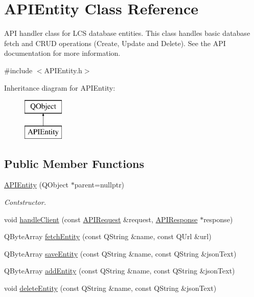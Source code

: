 \hypertarget{class_a_p_i_entity}{}\section{A\+P\+I\+Entity Class Reference}
\label{class_a_p_i_entity}


A\+PI handler class for L\+CS database entities. This class handles basic database fetch and C\+R\+UD operations (Create, Update and Delete). See the A\+PI documentation for more information.  




{\ttfamily \#include $<$A\+P\+I\+Entity.\+h$>$}

Inheritance diagram for A\+P\+I\+Entity\+:\begin{figure}[H]
\begin{center}
\leavevmode
\includegraphics[height=2.000000cm]{class_a_p_i_entity}
\end{center}
\end{figure}
\subsection*{Public Member Functions}
\begin{DoxyCompactItemize}
\item 
\mbox{\label{class_a_p_i_entity_a1408a64bcc760d3add4f9d5d67903e96}} 
\hyperlink{class_a_p_i_entity_a1408a64bcc760d3add4f9d5d67903e96}{A\+P\+I\+Entity} (Q\+Object $\ast$parent=nullptr)
\begin{DoxyCompactList}\small\item\em Contstructor. \end{DoxyCompactList}\item 
void \hyperlink{class_a_p_i_entity_a66ea6b2523afbb3acebaadf3aea1ec6c}{handle\+Client} (const \hyperlink{class_a_p_i_request}{A\+P\+I\+Request} \&request, \hyperlink{class_a_p_i_response}{A\+P\+I\+Response} $\ast$response)
\item 
Q\+Byte\+Array \hyperlink{class_a_p_i_entity_a4ff9b9128b1ad595dd07006544c99dee}{fetch\+Entity} (const Q\+String \&name, const Q\+Url \&url)
\item 
Q\+Byte\+Array \hyperlink{class_a_p_i_entity_a5f2de518701f362000bb6eb341fbf95b}{save\+Entity} (const Q\+String \&name, const Q\+String \&json\+Text)
\item 
Q\+Byte\+Array \hyperlink{class_a_p_i_entity_a8bbe43bbc389472d7a7fd9e8a2283c82}{add\+Entity} (const Q\+String \&name, const Q\+String \&json\+Text)
\item 
void \hyperlink{class_a_p_i_entity_ade40ac225523f1d00ed7c1eb8bdfec96}{delete\+Entity} (const Q\+String \&name, const Q\+String \&json\+Text)
\end{DoxyCompactItemize}


